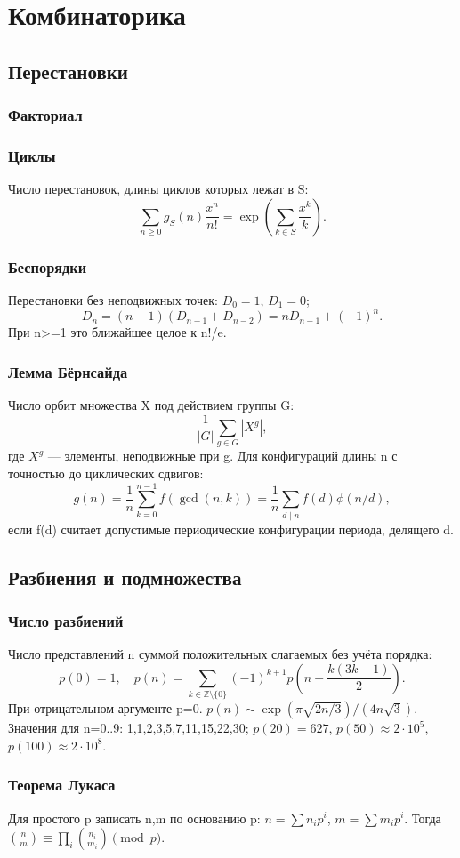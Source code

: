 \chapter{Комбинаторика}
\section{Перестановки}
\subsection{Факториал}

\subsection{Циклы}
Число перестановок, длины циклов которых лежат в S:
\[\sum_{n\ge0}g_S(n)\frac{x^n}{n!}=\exp\left(\sum_{k\in S}\frac{x^k}{k}\right).\]
\subsection{Беспорядки}
Перестановки без неподвижных точек: $D_0=1$, $D_1=0$;
\[D_n=(n-1)(D_{n-1}+D_{n-2})=nD_{n-1}+(-1)^n.\]
При n>=1 это ближайшее целое к n!/e.
\subsection{Лемма Бёрнсайда}
Число орбит множества X под действием группы G:
\[\frac1{|G|}\sum_{g\in G}|X^g|,\]
где $X^g$ — элементы, неподвижные при g.
Для конфигураций длины n с точностью до циклических сдвигов:
\[g(n)=\frac1n\sum_{k=0}^{n-1}f(\gcd(n,k))
=\frac1n\sum_{d\mid n}f(d)\phi(n/d),\]
если f(d) считает допустимые периодические конфигурации периода,
делящего d.
\section{Разбиения и подмножества}
\subsection{Число разбиений}
Число представлений n суммой положительных слагаемых без учёта порядка:
\[p(0)=1,\quad p(n)=\sum_{k\in\mathbb Z\setminus\{0\}}
(-1)^{k+1}p\left(n-\frac{k(3k-1)}2\right).\]
При отрицательном аргументе p=0.
$p(n)\sim\exp(\pi\sqrt{2n/3})/(4n\sqrt3)$.
Значения для n=0..9: 1,1,2,3,5,7,11,15,22,30;
$p(20)=627$, $p(50)\approx2\cdot10^5$, $p(100)\approx2\cdot10^8$.
\subsection{Теорема Лукаса}
Для простого p записать n,m по основанию p:
$n=\sum n_ip^i$, $m=\sum m_ip^i$. Тогда
$\binom nm\equiv\prod_i\binom{n_i}{m_i}\pmod p$.

